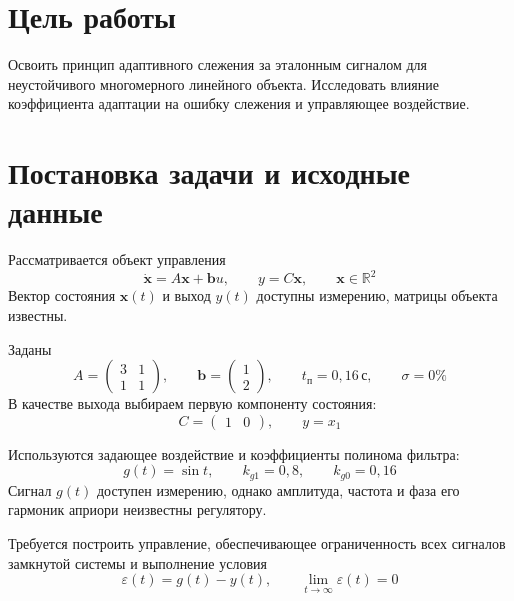 
\tableofcontents
\newpage

\section{Цель работы}

Освоить принцип адаптивного слежения за эталонным сигналом
для неустойчивого многомерного линейного объекта. Исследовать влияние
коэффициента адаптации на ошибку слежения и управляющее воздействие.

\section{Постановка задачи и исходные данные}

Рассматривается объект управления
\begin{equation}
  \dot{\bm x}=A\bm x+\bm b u,
  \qquad y=C\bm x,
  \qquad \bm x\in\mathbb R^2
  \label{eq:plant}
\end{equation}
Вектор состояния $\bm x(t)$ и выход $y(t)$ доступны измерению,
матрицы объекта известны.

Заданы
\begin{equation}
  A=\begin{pmatrix}3&1\\1&1\end{pmatrix},
  \qquad
  \bm b=\begin{pmatrix}1\\2\end{pmatrix},
  \qquad t_{\text{п}}=0{,}16\,\text{с},
  \qquad \sigma=0\%
  \label{eq:variant}
\end{equation}
В качестве выхода выбираем первую компоненту состояния:
\begin{equation}
  C=\begin{pmatrix}1&0\end{pmatrix},
  \qquad y=x_1
  \label{eq:output}
\end{equation}

Используются задающее воздействие и коэффициенты полинома фильтра:
\begin{equation}
  g(t)=\sin t,
  \qquad k_{g1}=0{,}8,
  \qquad k_{g0}=0{,}16
  \label{eq:reference-data}
\end{equation}
Сигнал $g(t)$ доступен измерению, однако амплитуда, частота
и фаза его гармоник априори неизвестны регулятору.

Требуется построить управление, обеспечивающее ограниченность
всех сигналов замкнутой системы и выполнение условия
\begin{equation}
  \varepsilon(t)=g(t)-y(t),
  \qquad \lim_{t\to\infty}\varepsilon(t)=0
  \label{eq:goal}
\end{equation}

